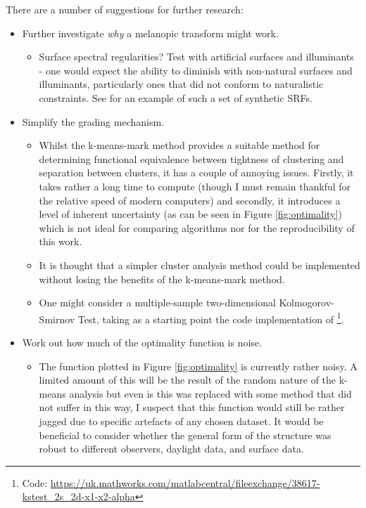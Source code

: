There are a number of suggestions for further research:
\begin{itemize}
\item Further investigate \emph{why} a melanopic transform might work.
\begin{itemize}
\item Surface spectral regularities? Test with artificial surfaces and illuminants - one would expect the ability to diminish with non-natural surfaces and illuminants, particularly ones that did not conform to naturalistic constraints. See \citet[p. 239-40]{macdonald_realistic_2014} for an example of such a set of synthetic \glspl{SRF}.
\end{itemize}
\item Simplify the grading mechanism.
\begin{itemize}
    \item Whilst the k-means-mark method provides a suitable method for determining functional equivalence between tightness of clustering and separation between clusters, it has a couple of annoying issues. Firstly, it takes rather a long time to compute (though I must remain thankful for the relative speed of modern computers) and secondly, it introduces a level of inherent uncertainty (as can be seen in Figure \ref{fig:optimality}) which is not ideal for comparing algorithms nor for the reproducibility of this work.
    \item It is thought that a simpler cluster analysis method could be implemented without losing the benefits of the k-means-mark method.
    \item One might consider a multiple-sample two-dimensional Kolmogorov-Smirnov Test, taking as a starting point the code implementation of \citet{peacock_two-dimensional_1983}\footnote{Code: \url{https://uk.mathworks.com/matlabcentral/fileexchange/38617-kstest_2s_2d-x1-x2-alpha}}.
\end{itemize}
\item Work out how much of the optimality function is noise.
\begin{itemize}
\item The function plotted in Figure \ref{fig:optimality} is currently rather noisy. A limited amount of this will be the result of the random nature of the k-means analysis but even is this was replaced with some method that did not suffer in this way, I suspect that this function would still be rather jagged due to specific artefacts of any chosen dataset. It would be beneficial to consider whether the general form of the structure was robust to different observers, daylight data, and surface data.

\end{itemize}
\end{itemize}
